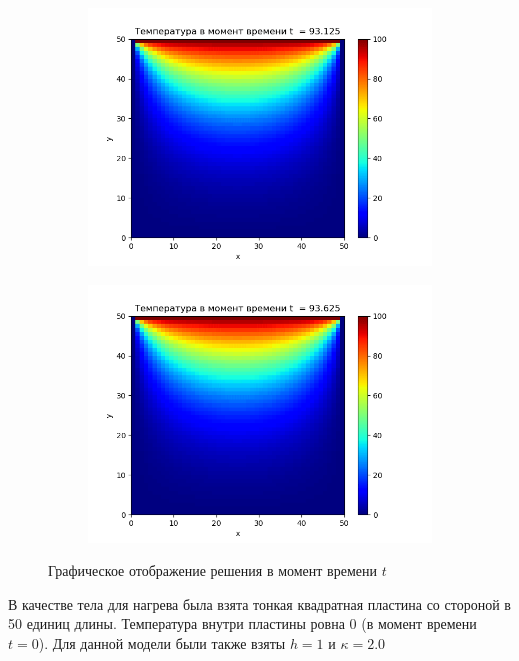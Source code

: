 \documentclass[a4paper]{extarticle}
\begin{document}
\begin{figure}[h!]
\begin{subfigure}[b]{0.5\textwidth}
	\includegraphics[width=\textwidth]{hes_pic-745.png}
\end{subfigure}
\hfill
\begin{subfigure}[b]{0.5\textwidth}
	\includegraphics[width=\textwidth]{hes_pic-749.png}
\end{subfigure}
\captionsetup{labelfont=bf, labelsep=space}
\caption{Графическое отображение решения в момент времени $t$}
\end{figure}

В качестве тела для нагрева была взята тонкая квадратная пластина со стороной в 50 единиц длины. Температура внутри пластины ровна 0 (в момент времени $t=0$). Для данной модели были также взяты $h = 1$ и $\kappa = 2.0$
\end{document}

